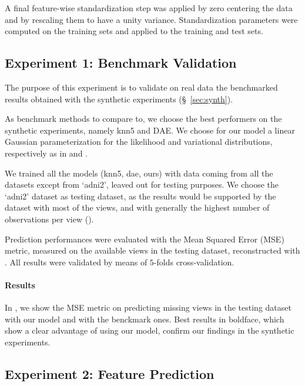 A final feature-wise standardization step was applied by zero centering the data and by rescaling them to have a unity variance.
Standardization parameters were computed on the training sets and applied to the training and test sets.


\subsection{Experiment 1: Benchmark Validation}


The purpose of this experiment is to validate on real data the benchmarked results obtained with the synthetic experiments (\S~\ref{sec:synth}).

As benchmark methods to compare to, we choose the best performers on the synthetic experiments, namely knn5 and DAE.
We choose for our model a linear Gaussian parameterization for the likelihood and variational distributions, respectively as in  and .

We trained all the models (knn5, dae, ours) with data coming from all the datasets except from `adni2', leaved out for testing purposes.
We choose the `adni2' dataset as testing dataset, as the results would be supported by the dataset with most of the views, and with generally the highest number of observations per view ().

Prediction performances were evaluated with the Mean Squared Error (MSE) metric, measured on the available views in the testing dataset, reconstructed with .
All results were validated by means of $5$-folds cross-validation.

\paragraph{Results}
In , we show the MSE metric on predicting missing views in the testing dataset with our model and with the benckmark ones.
Best results in boldface, which show a clear advantage of using our model, confirm our findings in the synthetic experiments.

\subsection{Experiment 2: Feature Prediction}
\label{ssec:feats}



